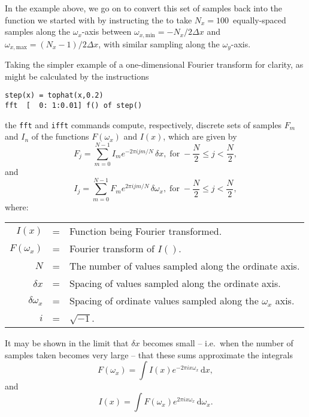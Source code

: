 In the example above, we go on to convert this set of samples back into the
function we started with by instructing the  to take
$N_x=100$~equally-spaced samples along the $\omega_x$-axis between
$\omega_{x,\mathrm{min}}=-{N_x}/{2\Delta x}$ and
$\omega_{x,\mathrm{max}}=(N_x-1)/{2\Delta x}$, with similar sampling along the
$\omega_y$-axis.

Taking the simpler example of a one-dimensional Fourier transform for clarity,
as might be calculated by the instructions
\begin{verbatim}
step(x) = tophat(x,0.2)
fft  [  0: 1:0.01] f() of step()
\end{verbatim}
the {\tt fft} and {\tt ifft} commands compute,
respectively, discrete sets of samples $F_m$ and $I_n$ of the functions
$F(\omega_x)$ and $I(x)$, which are given by
\begin{displaymath}
F_j = \sum_{m=0}^{N-1} I_m e^{-2\pi ijm/N} \,\delta x,\;\textrm{for}\; -\frac{N}{2}\leq j <\frac{N}{2} ,
\end{displaymath}
\noindent and
\begin{displaymath}
I_j = \sum_{m=0}^{N-1} F_m e^{ 2\pi ijm/N} \,\delta \omega_x,\;\textrm{for}\; -\frac{N}{2}\leq j <\frac{N}{2} ,
\end{displaymath}
\noindent where:
\begin{tabular}{rcp{9cm}}
$I(x)$        & = & Function being Fourier transformed. \\
$F(\omega_x)$ & = & Fourier transform of $I()$. \\
$N$           & = & The number of values sampled along the ordinate axis. \\
$\delta x$    & = & Spacing of values sampled along the ordinate axis. \\
$\delta \omega_x$ & = & Spacing of ordinate values sampled along the $\omega_x$ axis. \\
$i$           & = & $\sqrt{-1}$. \\
\end{tabular}
\vspace{2mm}

It may be shown in the limit that $\delta x$ becomes small -- i.e.\ when the
number of samples taken becomes very large -- that these sums approximate the
integrals
\begin{equation}
F(\omega_x) = \int I(x) e^{-2\pi ix\omega_x} \,\mathrm{d}x ,
\end{equation}
\noindent and
\begin{equation}
I(x) = \int F(\omega_x) e^{ 2\pi ix\omega_x} \,\mathrm{d}\omega_x .
\end{equation}

